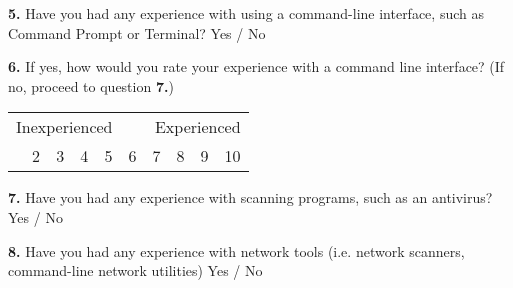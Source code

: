 \textbf{5.} Have you had any experience with using a command-line interface, such as Command Prompt or Terminal? \tab Yes / No

\clearpage

\textbf{6.} If yes, how would you rate your experience with a command line interface? (If no, proceed to question \textbf{7.})

\begin{table}[h]
	\centering
	\begin{tabularx}{\textwidth}{XXXXXXXXXX}
		\multicolumn{5}{l}{Inexperienced} & \multicolumn{5}{r}{Experienced} \\
		\centering
		1    & 2    & 3    & 4    & 5    & 6    & 7    & 8    & 9    & 10
	\end{tabularx}
\end{table}

\textbf{7.} Have you had any experience with scanning programs, such as an antivirus? \tab Yes / No

\vspace{0.5cm}

\textbf{8.} Have you had any experience with network tools (i.e. network scanners, command-line network utilities) \tab Yes / No
